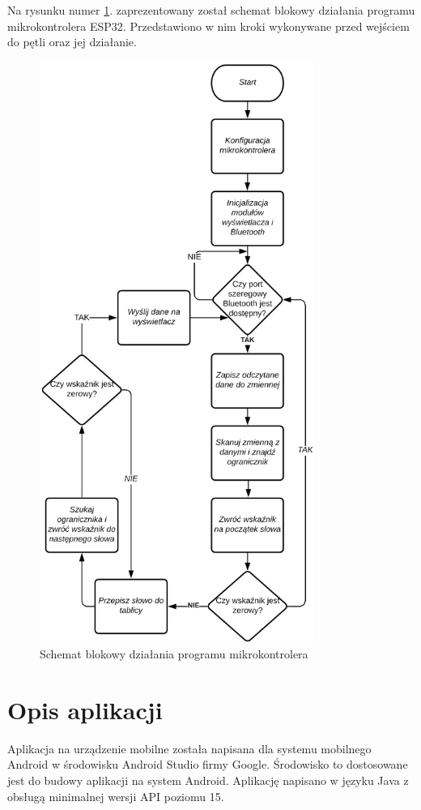 \documentclass[a4paper,12pt, twoside]{article}
\begin{document}
    	Na rysunku numer \ref{fig:petlamikrokontrolera}. zaprezentowany został schemat blokowy działania programu mikrokontrolera ESP32. Przedstawiono w nim kroki wykonywane przed wejściem do pętli oraz jej działanie.
    	\begin{figure}[H]
    	        \centering
    			\includegraphics[width=9cm]{images/schemat_petli_mikrokontrolera.png}
    			\caption{Schemat blokowy działania programu mikrokontrolera}
                \label{fig:petlamikrokontrolera}
    	\end{figure}
    	
    	\section{Opis aplikacji}
    	Aplikacja na urządzenie mobilne została napisana dla systemu mobilnego Android w środowisku Android Studio firmy Google. Środowisko to dostosowane jest do budowy aplikacji na system Android. Aplikację napisano w języku Java z obsługą minimalnej wersji API poziomu 15.
    	
\end{document}

